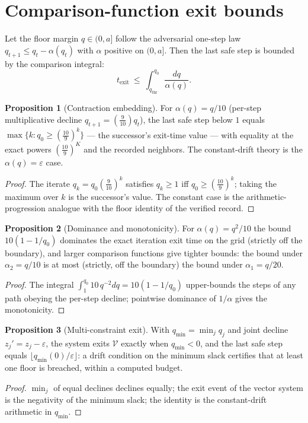 \documentclass[10pt,twocolumn]{article}
\theoremstyle{definition}
\newtheorem{proposition}{Proposition}
\begin{document}
\section{Comparison-function exit bounds}

Let the floor margin $q\in(0,a]$ follow the adversarial one-step law
$q_{t+1}\le q_t-\alpha(q_t)$ with $\alpha$ positive on $(0,a]$. Then the
last safe step is bounded by the comparison integral:
\begin{equation*}
t_{\mathrm{exit}}\ \le\ \int_{q_{\mathrm{thr}}}^{q_0}\frac{dq}{\alpha(q)}.
\end{equation*}

\begin{proposition}[Contraction embedding]
For $\alpha(q)=q/10$ (per-step multiplicative decline
$q_{t+1}=(\tfrac9{10})q_t$), the last safe step below $1$ equals
$\max\{k: q_0\ge(\tfrac{10}9)^k\}$ --- the successor's exit-time value
--- with equality at the exact powers $(\tfrac{10}9)^K$ and the recorded
neighbors. The constant-drift theory is the $\alpha(q)=\varepsilon$ case.
\end{proposition}
\begin{proof}
The iterate $q_k=q_0(\tfrac9{10})^k$ satisfies $q_k\ge1$ iff
$q_0\ge(\tfrac{10}9)^k$; taking the maximum over $k$ is the successor's
value. The constant case is the arithmetic-progression analogue with the
floor identity of the verified record.
\end{proof}

\begin{proposition}[Dominance and monotonicity]
For $\alpha(q)=q^2/10$ the bound $10(1-1/q_0)$ dominates the exact
iteration exit time on the grid (strictly off the boundary), and larger
comparison functions give tighter bounds: the bound under
$\alpha_2=q/10$ is at most (strictly, off the boundary) the bound under
$\alpha_1=q/20$.
\end{proposition}
\begin{proof}
The integral $\int_1^{q_0}10\,q^{-2}dq=10(1-1/q_0)$ upper-bounds the
steps of any path obeying the per-step decline; pointwise dominance of
$1/\alpha$ gives the monotonicity.
\end{proof}

\begin{proposition}[Multi-constraint exit]
With $q_{\min}=\min_j q_j$ and joint decline $z_j'=z_j-\varepsilon$, the
system exits $\mathcal V$ exactly when $q_{\min}<0$, and the last safe
step equals $\lfloor q_{\min}(0)/\varepsilon\rfloor$: a drift condition on
the minimum slack certifies that at least one floor is breached, within a
computed budget.
\end{proposition}
\begin{proof}
$\min_j$ of equal declines declines equally; the exit event of the vector
system is the negativity of the minimum slack; the identity is the
constant-drift arithmetic in $q_{\min}$.
\end{proof}
\end{document}
